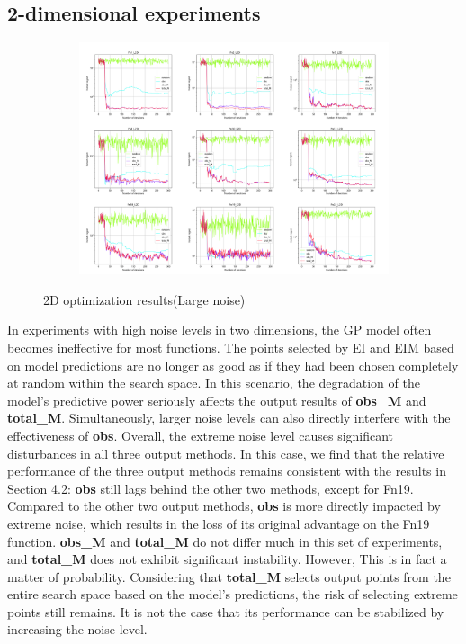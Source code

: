 \documentclass{article}
\begin{document}
\subsection{2-dimensional experiments}
\begin{figure}[H]
    \centering
    \begin{subfigure}[t]{.96\linewidth}
        \centering
        \includegraphics[width=1\textwidth]{pictures/Homo_noise_2D/noise2D_L.png}
    \end{subfigure}
    \caption{2D optimization results(Large noise)}
    \label{Fig7}
\end{figure}

\hspace{2em}In experiments with high noise levels in two dimensions, the GP model often becomes ineffective for most functions. The points selected by EI and EIM based on model predictions are no longer as good as if they had been chosen completely at random within the search space. In this scenario, the degradation of the model's predictive power seriously affects the output results of \textbf{obs\_M} and \textbf{total\_M}. Simultaneously, larger noise levels can also directly interfere with the effectiveness of \textbf{obs}. Overall, the extreme noise level causes significant disturbances in all three output methods. In this case, we find that the relative performance of the three output methods remains consistent with the results in Section 4.2: \textbf{obs} still lags behind the other two methods, except for Fn19. Compared to the other two output methods, \textbf{obs} is more directly impacted by extreme noise, which results in the loss of its original advantage on the Fn19 function. \textbf{obs\_M} and \textbf{total\_M} do not differ much in this set of experiments, and \textbf{total\_M} does not exhibit significant instability. However, This is in fact a matter of probability. Considering that \textbf{total\_M} selects output points from the entire search space based on the model's predictions, the risk of selecting extreme points still remains. It is not the case that its performance can be stabilized by increasing the noise level.
\end{document}
